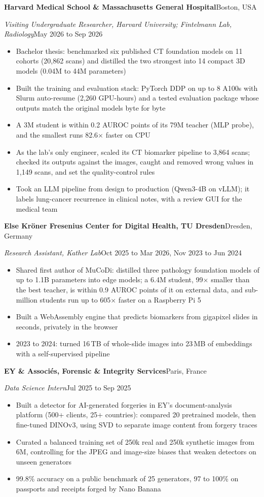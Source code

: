 \documentclass[10pt,a4paper]{article}
\newcommand{\eintrag}[4]{%
  \par\vspace{2.4pt}%
  \noindent\textbf{#1}\hfill{\ui\fontsize{9.5}{12.6}\selectfont\color{grau}#2}\par
  \noindent\textit{#3}\hfill{\ui\fontsize{9.5}{12.6}\selectfont\color{grau}#4}\par}
\begin{document}
\eintrag{Harvard Medical School \& Massachusetts General Hospital}{Boston, USA}{Visiting Undergraduate Researcher, Harvard University; Fintelmann Lab, Radiology}{May 2026 to Sep 2026}
\begin{itemize}
\item Bachelor thesis: benchmarked six published CT foundation models on 11 cohorts (20,862 scans) and distilled the two strongest into 14 compact 3D models (0.04M to 44M parameters)
\item Built the training and evaluation stack: PyTorch DDP on up to 8 A100s with Slurm auto-resume (2,260 GPU-hours) and a tested evaluation package whose outputs match the original models byte for byte
\item A 3M student is within 0.2 AUROC points of its 79M teacher (MLP probe), and the smallest runs 82.6$\times$ faster on CPU
\item As the lab's only engineer, scaled its CT biomarker pipeline to 3,864 scans; checked its outputs against the images, caught and removed wrong values in 1,149 scans, and set the quality-control rules
\item Took an LLM pipeline from design to production (Qwen3-4B on vLLM); it labels lung-cancer recurrence in clinical notes, with a review GUI for the medical team
\end{itemize}

\eintrag{Else Kröner Fresenius Center for Digital Health, TU Dresden}{Dresden, Germany}{Research Assistant, Kather Lab}{Oct 2025 to Mar 2026, Nov 2023 to Jun 2024}
\begin{itemize}
\item Shared first author of MuCoDi: distilled three pathology foundation models of up to 1.1B parameters into edge models; a 6.4M student, 99$\times$ smaller than the best teacher, is within 0.9 AUROC points of it on external data, and sub-million students run up to 605$\times$ faster on a Raspberry Pi 5
\item Built a WebAssembly engine that predicts biomarkers from gigapixel slides in seconds, privately in the browser
\item 2023 to 2024: turned 16\,TB of whole-slide images into 23\,MB of embeddings with a self-supervised pipeline
\end{itemize}

\eintrag{EY \& Associés, Forensic \& Integrity Services}{Paris, France}{Data Science Intern}{Jul 2025 to Sep 2025}
\begin{itemize}
\item Built a detector for AI-generated forgeries in EY's document-analysis platform (500+ clients, 25+ countries): compared 20 pretrained models, then fine-tuned DINOv3, using SVD to separate image content from forgery traces
\item Curated a balanced training set of 250k real and 250k synthetic images from 6M, controlling for the JPEG and image-size biases that weaken detectors on unseen generators
\item 99.8\% accuracy on a public benchmark of 25 generators, 97 to 100\% on passports and receipts forged by Nano Banana
\end{itemize}
\end{document}
